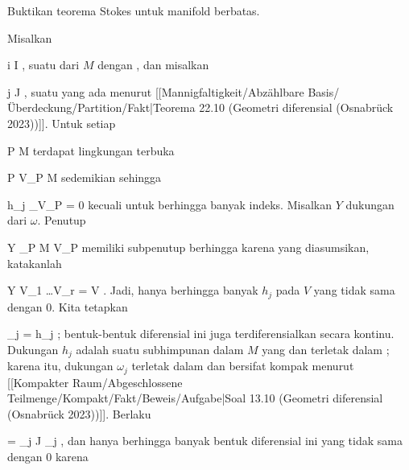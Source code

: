{

Buktikan teorema Stokes untuk manifold berbatas.

}
{

\teilbeweis {}{}{}
{Misalkan

 {}
 {i \in I} {}
 {} {} {} {,}
suatu
dari $M$ dengan
,
dan misalkan

 {}
 {j \in J} {}
 {} {} {} {,}
suatu
yang ada menurut
[[Mannigfaltigkeit/Abzählbare Basis/Überdeckung/Partition/Fakt|Teorema 22.10 (Geometri diferensial (Osnabrück 2023))]].
Untuk setiap

\mavergleichskette
{\vergleichskette
{ P
}
{ \in }{ M
}
{  }{
}
{    }{
}
{   }{
}
}
{}{}{}
terdapat lingkungan terbuka

\mavergleichskette
{\vergleichskette
{ P
}
{ \in }{ V_P
}
{ \subseteq }{ M
}
{    }{
}
{   }{
}
}
{}{}{}
sedemikian sehingga

\mavergleichskette
{\vergleichskette
{ h_j \vert_{V_P }
}
{ = }{ 0
}
{  }{
}
{    }{
}
{   }{
}
}
{}{}{}
kecuali untuk berhingga banyak indeks. Misalkan $Y$ dukungan dari $\omega$. Penutup

\mavergleichskette
{\vergleichskette
{ Y
}
{ \subseteq }{ \bigcup_{P \in M} V_P
}
{  }{
}
{    }{
}
{   }{
}
}
{}{}{}
memiliki subpenutup berhingga karena
yang diasumsikan, katakanlah

\mavergleichskettedisp
{\vergleichskette
{ Y
}
{ \subseteq} { V_{1} \cup \ldots \cup V_{r}
}
{ =} { V
}
{ } {
}
{ } {
}
}
{}{}{.}
Jadi, hanya berhingga banyak $h_j$ pada $V$ yang tidak sama dengan $0$. Kita tetapkan

\mavergleichskette
{\vergleichskette
{ \omega_j
}
{ = }{ h_j \omega
}
{  }{
}
{    }{
}
{   }{
}
}
{}{}{;}
bentuk-bentuk diferensial ini juga terdiferensialkan secara kontinu. Dukungan $h_j$ adalah suatu subhimpunan dalam $M$ yang
dan terletak dalam
; karena itu, dukungan $\omega_j$ terletak dalam
 dan bersifat kompak menurut
[[Kompakter Raum/Abgeschlossene Teilmenge/Kompakt/Fakt/Beweis/Aufgabe|Soal 13.10 (Geometri diferensial (Osnabrück 2023))]].
Berlaku

\mavergleichskettedisp
{\vergleichskette
{ \omega
}
{ =} { \sum_{j \in J} \omega_j
}
{ } {
}
{ } {
}
{ } {
}
}
{}{}{,}
dan hanya berhingga banyak bentuk diferensial
 ini yang tidak sama dengan $0$ karena

}}
